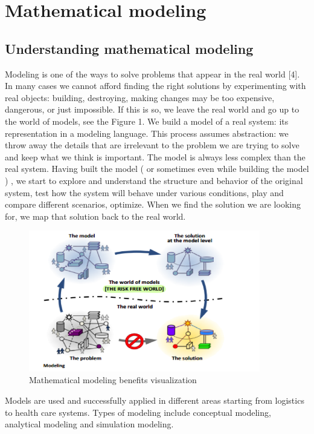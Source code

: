 \chapter{Mathematical modeling}

\section{Understanding mathematical modeling}

Modeling is one of the ways to solve problems that appear in the real world [4]. In many cases we cannot afford finding the right solutions by experimenting   with real objects:  building, destroying, making changes may be too expensive, dangerous, or just impossible. If this is so, we leave the real world and go up to the world of models, see the Figure 1. We build a model of a real system: its representation in a modeling language. This process assumes abstraction: we throw away the details that are irrelevant to the problem we are trying to solve and keep what we think is important. The model is always less complex than the real system. Having built the model ( or sometimes  even while building the model ) , we  start to explore and understand the structure and behavior of the original system, test how the system will behave under various conditions, play  and compare different scenarios, optimize.  When we find the solution we are looking for, we map that solution back to the real world.

\begin{figure}
   \centering
	\includegraphics[width=0.9\textwidth]{img/modeling}
	\caption[Clear]{Mathematical modeling benefits visualization}
\end{figure}

Models are used and successfully applied in different areas starting from logistics to health care systems. Types of modeling include conceptual modeling, analytical modeling and simulation modeling.

